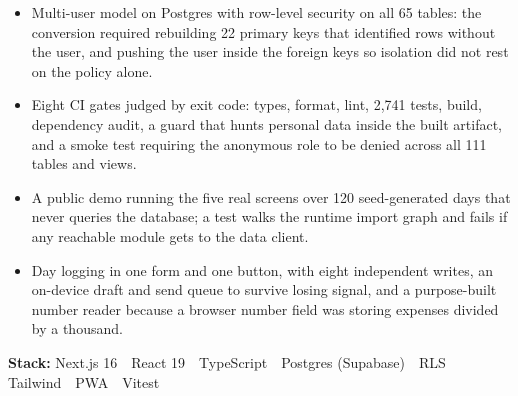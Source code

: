 \documentclass[a4paper,10pt]{article}
\begin{document}
\begin{itemize}[leftmargin=1.1em, itemsep=0pt, topsep=1pt, parsep=0pt]
  \item Multi-user model on Postgres with row-level security on all 65 tables: the conversion required rebuilding 22 primary keys that identified rows without the user, and pushing the user inside the foreign keys so isolation did not rest on the policy alone.
  \item Eight CI gates judged by exit code: types, format, lint, 2,741 tests, build, dependency audit, a guard that hunts personal data inside the built artifact, and a smoke test requiring the anonymous role to be denied across all 111 tables and views.
  \item A public demo running the five real screens over 120 seed-generated days that never queries the database; a test walks the runtime import graph and fails if any reachable module gets to the data client.
  \item Day logging in one form and one button, with eight independent writes, an on-device draft and send queue to survive losing signal, and a purpose-built number reader because a browser number field was storing expenses divided by a thousand.
\end{itemize}
{\small\textbf{Stack:} Next.js 16 \,\textperiodcentered\, React 19 \,\textperiodcentered\, TypeScript \,\textperiodcentered\, Postgres (Supabase) \,\textperiodcentered\, RLS \,\textperiodcentered\, Tailwind \,\textperiodcentered\, PWA \,\textperiodcentered\, Vitest}\par
\vspace{4pt}
\end{document}
